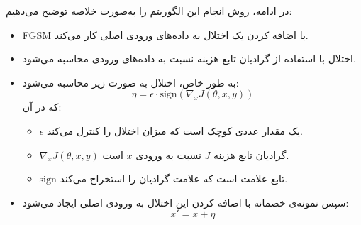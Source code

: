 \begin{qsolve}
	در ادامه، روش انجام این الگوریتم را به‌صورت خلاصه توضیح می‌دهیم:
	
	\begin{itemize}
		\item FGSM با اضافه کردن یک اختلال به داده‌های ورودی اصلی کار می‌کند.
		\item اختلال با استفاده از گرادیان تابع هزینه نسبت به داده‌های ورودی محاسبه می‌شود.
		\item به طور خاص، اختلال به صورت زیر محاسبه می‌شود:
		\[
		\eta = \epsilon \cdot \text{sign}(\nabla_x J(\theta, x, y))
		\]
		که در آن:
		\begin{itemize}
			\item \(\epsilon\) یک مقدار عددی کوچک است که میزان اختلال را کنترل می‌کند.
			\item \(\nabla_x J(\theta, x, y)\) گرادیان تابع هزینه \(J\) نسبت به ورودی \(x\) است.
			\item \(\text{sign}\) تابع علامت است که علامت گرادیان را استخراج می‌کند.
		\end{itemize}
		\item سپس نمونه‌ی خصمانه با اضافه کردن این اختلال به ورودی اصلی ایجاد می‌شود:
		\[
		x' = x + \eta
		\]
	\end{itemize}
	
\end{qsolve}











































